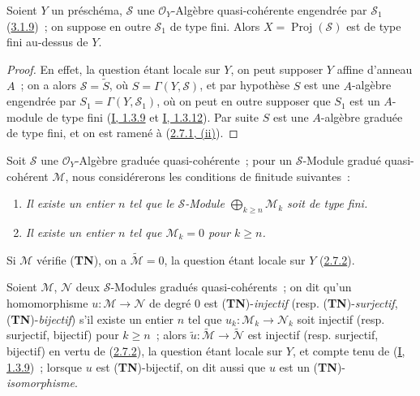 
\begin{proposition}[3.4.1]
\label{II.3.4.1-fr}
Soient $Y$ un préschéma, $\mathcal{S}$ une $\mathcal{O}_Y$-Algèbre
quasi-cohérente engendrée par $\mathcal{S}_1$
(\hyperref[II.3.1.9-fr]{3.1.9})~; on suppose en outre $\mathcal{S}_1$ de type
fini. Alors $X=\operatorname{Proj}(\mathcal{S})$ est de type fini au-dessus de
$Y$.
\end{proposition}

\begin{proof}
En effet, la question étant locale sur $Y$, on peut supposer $Y$ affine
d'anneau $A$~; on a alors $\mathcal{S}=\widetilde{S}$, où
$S=\Gamma(Y,\mathcal{S})$, et par hypothèse $S$ est une $A$-algèbre engendrée
par $S_1=\Gamma(Y,\mathcal{S}_1)$, où on peut en outre supposer que $S_1$ est
un $A$-module de type fini
(\hyperref[I.1.3.9-fr]{I, 1.3.9} et
\hyperref[I.1.3.12-fr]{I, 1.3.12}). Par suite $S$ est une $A$-algèbre graduée
de type fini, et on est ramené à
(\hyperref[II.2.7.1-fr]{2.7.1, (ii)}).
\end{proof}

\begin{env}[3.4.2]
\label{II.3.4.2-fr}
Soit $\mathcal{S}$ une $\mathcal{O}_Y$-Algèbre graduée quasi-cohérente~; pour
un $\mathcal{S}$-Module gradué quasi-cohérent $\mathcal{M}$, nous considérerons
les conditions de finitude suivantes~:
\begin{enumerate}
  \item[(\textbf{TF})] \emph{Il existe un entier $n$ tel que le
    $\mathcal{S}$-Module $\bigoplus_{k\geq n}\mathcal{M}_k$ soit de type fini.}
  \item[(\textbf{TN})] \emph{Il existe un entier $n$ tel que
    $\mathcal{M}_k=0$ pour $k\geq n$.}
\end{enumerate}
Si $\mathcal{M}$ vérifie (\textbf{TN}), on a
$\widetilde{\mathcal{M}}=0$, la question étant locale sur $Y$
(\hyperref[II.2.7.2-fr]{2.7.2}).

Soient $\mathcal{M}$, $\mathcal{N}$ deux $\mathcal{S}$-Modules gradués
quasi-cohérents~; on dit qu'un homomorphisme
$u:\mathcal{M}\to\mathcal{N}$ de degré $0$ est
(\textbf{TN})-\emph{injectif} (resp. (\textbf{TN})-\emph{surjectif},
(\textbf{TN})-\emph{bijectif}) s'il existe un entier $n$ tel que
$u_k:\mathcal{M}_k\to\mathcal{N}_k$ soit injectif (resp. surjectif, bijectif)
pour $k\geq n$~; alors
$\widetilde{u}:\widetilde{\mathcal{M}}\to\widetilde{\mathcal{N}}$ est injectif
(resp. surjectif, bijectif) en vertu de
(\hyperref[II.2.7.2-fr]{2.7.2}), la question étant locale sur $Y$, et compte
tenu de (\hyperref[I.1.3.9-fr]{I, 1.3.9})~; lorsque $u$ est
(\textbf{TN})-bijectif, on dit aussi que $u$ est un
(\textbf{TN})-\emph{isomorphisme}.
\end{env}


